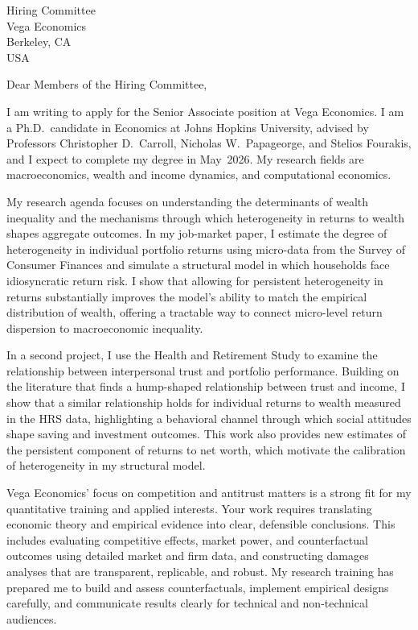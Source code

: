 \documentclass[11pt,letterpaper]{letter}
\begin{document}
\begin{letter}{Hiring Committee \\
Vega Economics \\
Berkeley, CA \\ USA}

\opening{Dear Members of the Hiring Committee,}

I am writing to apply for the Senior Associate position at Vega Economics. I am a Ph.D.\ candidate in Economics at Johns Hopkins University, advised by Professors Christopher D.~Carroll, Nicholas W.~Papageorge, and Stelios Fourakis, and I expect to complete my degree in May~2026. My research fields are macroeconomics, wealth and income dynamics, and computational economics.

My research agenda focuses on understanding the determinants of wealth inequality and the mechanisms through which heterogeneity in returns to wealth shapes aggregate outcomes. In my job-market paper, I estimate the degree of heterogeneity in individual portfolio returns using micro-data from the Survey of Consumer Finances and simulate a structural model in which households face idiosyncratic return risk. I show that allowing for persistent heterogeneity in returns substantially improves the model’s ability to match the empirical distribution of wealth, offering a tractable way to connect micro-level return dispersion to macroeconomic inequality.

In a second project, I use the Health and Retirement Study to examine the relationship between interpersonal trust and portfolio performance. Building on the literature that finds a hump-shaped relationship between trust and income, I show that a similar relationship holds for individual returns to wealth measured in the HRS data, highlighting a behavioral channel through which social attitudes shape saving and investment outcomes. This work also provides new estimates of the persistent component of returns to net worth, which motivate the calibration of heterogeneity in my structural model.

Vega Economics’ focus on competition and antitrust matters is a strong fit for my quantitative training and applied interests. Your work requires translating economic theory and empirical evidence into clear, defensible conclusions. This includes evaluating competitive effects, market power, and counterfactual outcomes using detailed market and firm data, and constructing damages analyses that are transparent, replicable, and robust. My research training has prepared me to build and assess counterfactuals, implement empirical designs carefully, and communicate results clearly for technical and non-technical audiences.


\end{letter}
\end{document}
